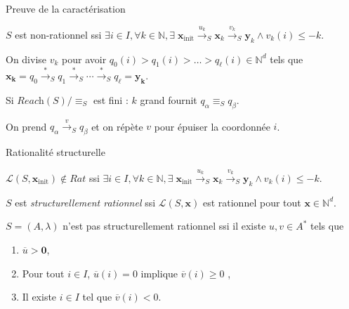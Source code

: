 \documentclass[french]{beamer}
\newcommand{\N}{\ensuremath{\mathbb{N}}}
\newcommand{\lang}{\ensuremath{\mathcal{L}}}
\newcommand{\reach}{\ensuremath{\textit{Reach}}}
\newcommand{\trans}[2]{\ensuremath{\stackrel{#1}{\longrightarrow}_{#2}}}
\newcommand{\vect}[1]{\ensuremath{\mathbf{#1}}}
\newcommand{\rel}{\ensuremath{\equiv}}
\newcommand{\xinit}{\ensuremath{\vect{x}_\text{init}}}
\newcommand{\valeur}[1]{\ensuremath{\overline{#1}}}
\newcommand{\Jfin}[1]{J^\text{fin}_{#1}}
\let\oldemph\emph
\renewcommand{\emph}[1]{\oldemph{\color{blue}#1}}
\begin{document}
\begin{frame}{Preuve de la caractérisation}

\begin{corollary}
$S$ est non-rationnel ssi $\exists i\in I, \forall k\in\N, \exists \; \xinit \trans{u_k}{S} \vect{x}_k \trans{v_k}{S} \vect{y}_k \land v_k(i) \leq -k$.
\end{corollary}

\vspace{5mm}
On divise $v_k$ pour avoir $q_0(i) > q_1(i) > \dots > q_\ell(i) \in\N^d$ tels que $\vect{x_k} = q_0 \trans{*}{S} q_1 \trans{*}{S} \cdots \trans{*}{S} q_\ell = \vect{y_k}$.

\vspace{3mm}
Si $\reach(S)/\rel_S$ est fini : \hspace{5mm}
$k$ grand fournit $q_\alpha \rel_S q_\beta$.

On prend $q_\alpha \trans{v}{S} q_\beta$ et
on répète $v$ pour épuiser la coordonnée $i$.
\end{frame}


\begin{frame}{Rationalité structurelle}
\begin{corollary}[Rappel]
$\lang(S,\xinit) \notin Rat$ ssi
$\exists i\in I, \forall k\in\N, \exists \; \xinit \trans{u_k}{S} \vect{x}_k \trans{v_k}{S} \vect{y}_k \land v_k(i) \leq -k$.
\end{corollary}

\begin{definition}
$S$ est \emph{structurellement rationnel} ssi $\lang(S,\vect{x})$ est rationnel pour tout $\vect{x} \in \N^d$.
\end{definition}

\begin{theorem}
$S=(A,\lambda)$ n'est pas structurellement rationnel ssi il existe $u,v\in A^*$ tels que 
\begin{enumerate}
    \item $\valeur{u} > \vect{0}$,
    \item Pour tout $i \in I$, $\valeur{u}(i)=0$ implique $\valeur{v}(i) \geq 0$ ,
    \item Il existe $i\in I$ tel que $\valeur{v}(i) < 0$.
\end{enumerate}
\end{theorem}
    
\end{frame}
\end{document}
